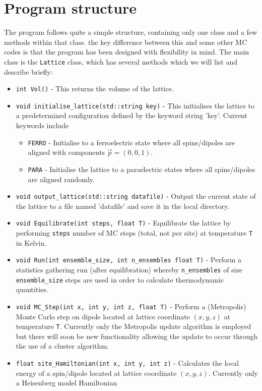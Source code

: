 \documentclass[aps,prb,twocolumn,showpacs,superscriptaddress,floatfix]{revtex4-1}
\begin{document}
\section{Program structure}
The program follows quite a simple structure, containing only one class and a few methods within that class. the key difference between this and some other MC codes is that the program has been designed with flexibility in mind. The main class is the {\tt Lattice} class, which has several methods which we will list and describe briefly:

\begin{itemize}
\item {\tt int Vol()} - This returns the volume of the lattice.
\item {\tt void initialise\_lattice(std::string key)} - This initialises the lattice to a predetermined configuration defined by the keyword string 'key'. Current keywords include 
	\begin{itemize}
	\item {\tt FERRO} - Initialise to a ferroelectric state where all spins/dipoles are aligned with components $\vec{p}=(0,0,1)$.
	\item {\tt PARA} - Initialise the lattice to a paraelectric states where all spins/dipoles are aligned randomly.
	\end{itemize}
\item {\tt void output\_lattice(std::string datafile)} - Output the current state of the lattice to a file named 'datafile' and save it in the local directory.
\vspace{5pt}
\item {\tt void Equilibrate(int steps, float T)} - Equilibrate the lattice by performing {\tt steps} number of MC steps (total, not per site) at temperature {\tt T} in Kelvin.
\item {\tt void Run(int ensemble\_size, int n\_ensembles float T)} - Perform a statistics gathering run (after equilibration) whereby {\tt n\_ensembles} of  size {\tt ensemble\_size} steps are used in order to calculate thermodynamic quantities.
\item {\tt void MC\_Step(int x, int y, int z, float T)} -  Perform a (Metropolis) Monte Carlo step on dipole located at lattice coordinate $(x,y,z)$ at temperature {\tt T}. Currently only the Metropolis update algorithm is employed but there will soon be new functionality allowing the update to occur through the use of a cluster algorithm.
\item {\tt float site\_Hamiltonian(int x, int y, int z)} - Calculates the local energy of a spin/dipole located at lattice coordinate $(x,y,z)$. Currently only a Heisenberg model Hamiltonian

\end{itemize}
\end{document}
